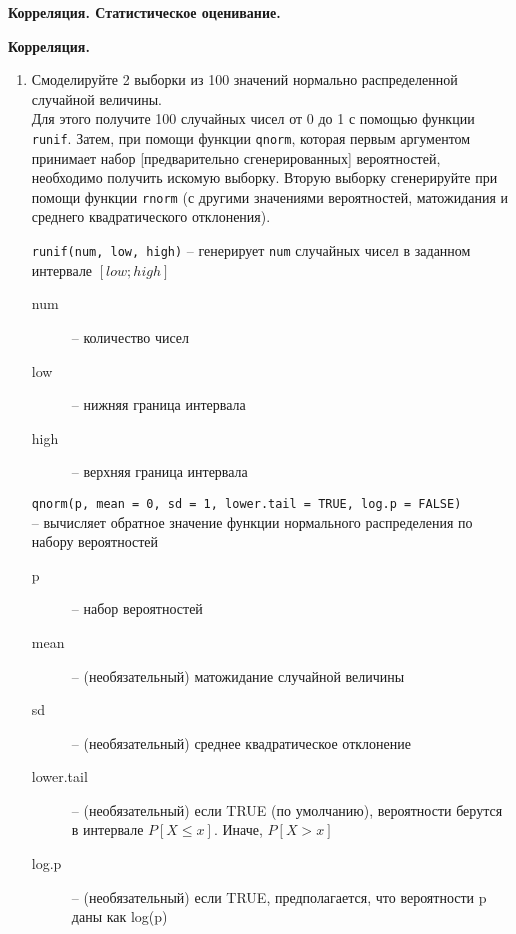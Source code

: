 
\textbf{\large Корреляция. Статистическое оценивание.}

\textbf{Корреляция.}

\begin{enumerate}

    \item Смоделируйте 2 выборки из 100 значений нормально распределенной случайной величины. \\
          Для этого получите 100 случайных чисел от 0 до 1 с помощью функции \texttt{runif}.
          Затем, при помощи функции \texttt{qnorm}, которая первым аргументом принимает 
          набор [предварительно сгенерированных] вероятностей, необходимо получить искомую выборку.
          Вторую выборку сгенерируйте при помощи функции \texttt{rnorm} 
          (с другими значениями вероятностей, матожидания и среднего квадратического отклонения).

          \begin{mdframed}[style=BadassFrame]

              \texttt{runif(num, low, high)} 
                -- генерирует \texttt{num} случайных чисел в заданном интервале $[low; high]$  
              \begin{description}

                \item[num] -- количество чисел
                \item[low] -- нижняя граница интервала
                \item[high] -- верхняя граница интервала
              \end{description}
          \end{mdframed}

          \begin{mdframed}[style=BadassFrame]

              \texttt{qnorm(p, mean = 0, sd = 1, lower.tail = TRUE, log.p = FALSE)} \\
                -- вычисляет обратное значение функции нормального распределения по набору вероятностей
              \begin{description}

                \item[p] -- набор вероятностей
                \item[mean] -- (необязательный) матожидание случайной величины
                \item[sd] -- (необязательный) среднее квадратическое отклонение
                \item[lower.tail] -- (необязательный) если TRUE (по умолчанию), вероятности берутся в интервале $P[X \leq x]$. Иначе, $P[X > x]$ 
                \item[log.p] -- (необязательный) если TRUE, предполагается, что вероятности p даны как log(p)
              \end{description}
          \end{mdframed}


\end{enumerate}
